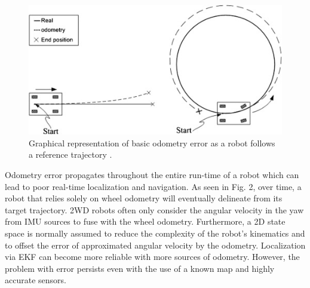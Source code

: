 \documentclass[conference]{IEEEtran}
\begin{document}
\begin{figure}
	\includegraphics[width=\linewidth]{./figs/odometry_error.jpg}
	\caption{Graphical representation of basic odometry error as a robot follows a reference trajectory \cite{RN101}.}
\end{figure}
Odometry error propagates throughout the entire run-time of a robot which can lead to poor real-time localization and navigation. As seen in Fig. 2, over time, a robot that relies solely on wheel odometry will eventually delineate from its target trajectory. 2WD robots often only consider the angular velocity in the yaw from IMU sources to fuse with the wheel odometry. Furthermore, a 2D state space is normally assumed to reduce the complexity of the robot's kinematics and to offset the error of approximated angular velocity by the odometry. Localization via EKF can become more reliable with more sources of odometry. However, the problem with error persists even with the use of a known map and highly accurate sensors.
\end{document}
